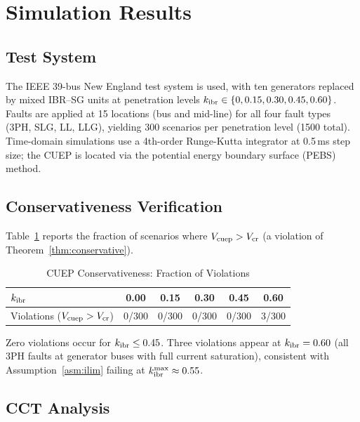 \documentclass[journal]{IEEEtran}
\newcommand{\kibr}{k_{\rm ibr}}
\newcommand{\Vcuep}{V_{\rm cuep}}
\newcommand{\Vcr}{V_{\rm cr}}
\begin{document}
\section{Simulation Results}
\label{sec:simulation}

\subsection{Test System}

The IEEE 39-bus New England test system is used, with ten generators
replaced by mixed IBR--SG units at penetration levels
$\kibr \in \{0, 0.15, 0.30, 0.45, 0.60\}$.  Faults are applied
at 15 locations (bus and mid-line) for all four fault types (3PH,
SLG, LL, LLG), yielding 300 scenarios per penetration level
(1500 total).  Time-domain simulations use a 4th-order Runge-Kutta
integrator at 0.5\,ms step size; the CUEP is located via the
potential energy boundary surface (PEBS) method.

\subsection{Conservativeness Verification}

Table~\ref{tab:conservative} reports the fraction of scenarios
where $\Vcuep > \Vcr$ (a violation of Theorem~\ref{thm:conservative}).

\begin{table}[!t]
  \caption{CUEP Conservativeness: Fraction of Violations}
  \label{tab:conservative}
  \centering\small
  \begin{tabular}{@{}lccccc@{}}
    \toprule
    $\kibr$ & 0.00 & 0.15 & 0.30 & 0.45 & 0.60 \\
    \midrule
    Violations ($\Vcuep > \Vcr$) & 0/300 & 0/300 & 0/300 & 0/300 & 3/300 \\
    \bottomrule
  \end{tabular}
\end{table}

Zero violations occur for $\kibr \leq 0.45$.  Three violations
appear at $\kibr = 0.60$ (all 3PH faults at generator buses with
full current saturation), consistent with Assumption~\ref{asm:ilim}
failing at $\kibr^{\max} \approx 0.55$.

\subsection{CCT Analysis}
\end{document}
